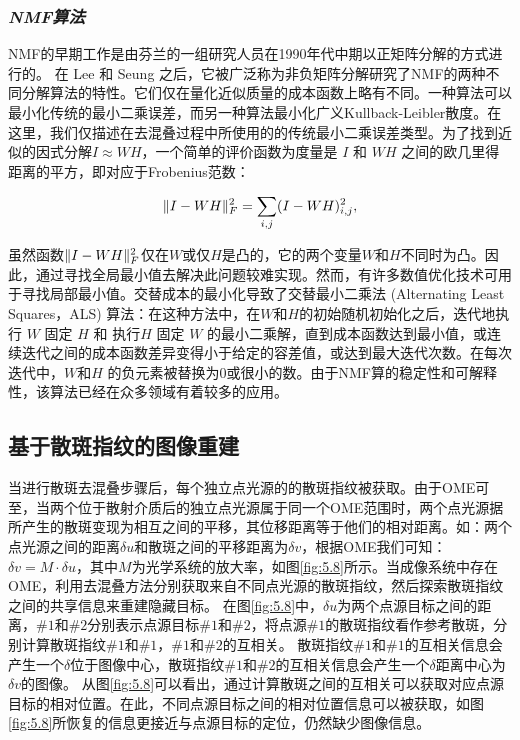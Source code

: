 \subsubsection*{\textbf{\textit{NMF算法}}}

NMF的早期工作是由芬兰的一组研究人员\cite{paatero_positive_1994}在1990年代中期以正矩阵分解的方式进行的。 在 Lee 和 Seung 之后，它被广泛称为非负矩阵分解研究了NMF的两种不同分解算法的特性\cite{lee_learning_1999,lee_algorithms_2001}。它们仅在量化近似质量的成本函数上略有不同。一种算法可以最小化传统的最小二乘误差，而另一种算法最小化广义Kullback-Leibler散度。在这里，我们仅描述在去混叠过程中所使用的的传统最小二乘误差类型。为了找到近似的因式分解$I \approx WH$，一个简单的评价函数为度量是 $I$ 和 $WH$ 之间的欧几里得距离的平方，即对应于Frobenius范数：

\begin{equation}
	\begin{aligned}
\Arrowvert I -WH\Arrowvert_F^{2} = \sum_{i,j} (I -WH)_{i,j}^2,
\label{eq:5.3}
\end{aligned}
\end{equation}

虽然函数$\Arrowvert I -WH\Arrowvert_F^{2}$仅在$W$或仅$H$是凸的，它的两个变量$W$和$H$不同时为凸。因此，通过寻找全局最小值去解决此问题较难实现。然而，有许多数值优化技术可用于寻找局部最小值。交替成本的最小化导致了交替最小二乘法 (Alternating Least Squares，ALS) 算法：在这种方法中，在$W$和$H$的初始随机初始化之后，迭代地执行 $W$ 固定 $H$ 和 执行$H$ 固定 $W$ 的最小二乘解，直到成本函数达到最小值，或连续迭代之间的成本函数差异变得小于给定的容差值，或达到最大迭代次数。在每次迭代中，$W$和$H$ 的负元素被替换为$0$或很小的数。由于NMF算的稳定性和可解释性，该算法已经在众多领域有着较多的应用。

\subsection{基于散斑指纹的图像重建}

当进行散斑去混叠步骤后，每个独立点光源的的散斑指纹被获取。由于OME\cite{Freund1988,katz_non-invasive_2014,bertolotti_non-invasive_2012}可至，当两个位于散射介质后的独立点光源属于同一个OME范围时，两个点光源据所产生的散斑变现为相互之间的平移，其位移距离等于他们的相对距离。如：两个点光源之间的距离$\delta u$和散斑之间的平移距离为$\delta v$，根据OME我们可知：$\delta v = M \cdot \delta u$，其中$M$为光学系统的放大率，如图\ref{fig:5.8}所示。当成像系统中存在OME，利用去混叠方法分别获取来自不同点光源的散斑指纹，然后探索散斑指纹之间的共享信息来重建隐藏目标。
在图\ref{fig:5.8}中，$\delta u$为两个点源目标之间的距离，$\# 1$和$\# 2$分别表示点源目标$\# 1$和$\# 2$，将点源$\# 1$的散斑指纹看作参考散斑，分别计算散斑指纹$\# 1$和$\# 1$，$\# 1$和$\# 2$的互相关。
散斑指纹$\# 1$和$\# 1$的互相关信息会产生一个$\delta $位于图像中心，散斑指纹$\# 1$和$\# 2$的互相关信息会产生一个$\delta $距离中心为$\delta v$的图像。
从图\ref{fig:5.8}可以看出，通过计算散斑之间的互相关可以获取对应点源目标的相对位置。在此，不同点源目标之间的相对位置信息可以被获取，如图\ref{fig:5.8}所恢复的信息更接近与点源目标的定位，仍然缺少图像信息。

